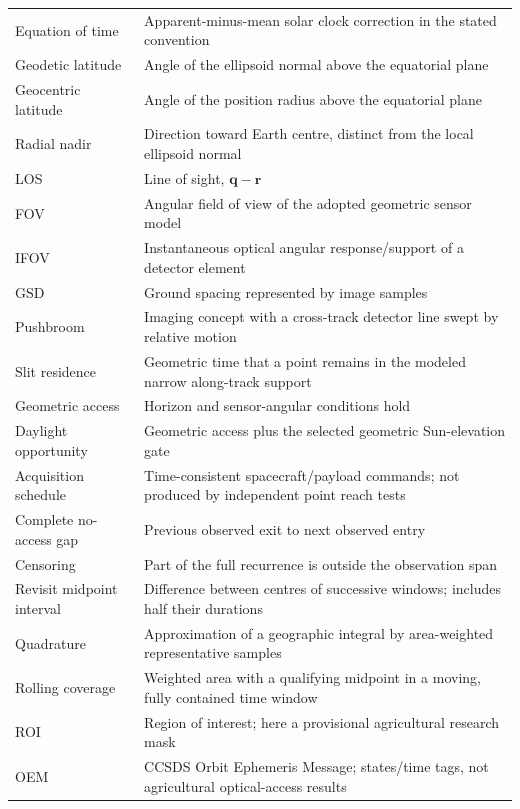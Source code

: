 \documentclass[10pt,a4paper]{article}
\numberwithin{equation}{section}
\begin{document}
\begin{longtable}{@{}>{\raggedright\arraybackslash}p{}>{\raggedright\arraybackslash}p{}@{}}
\rowcolor{rowalt}Equation of time & Apparent-minus-mean solar clock correction in the stated convention \\
Geodetic latitude & Angle of the ellipsoid normal above the equatorial plane \\
\rowcolor{rowalt}Geocentric latitude & Angle of the position radius above the equatorial plane \\
Radial nadir & Direction toward Earth centre, distinct from the local ellipsoid normal \\
\rowcolor{rowalt}LOS & Line of sight, \(\mathbf q-\mathbf r\) \\
FOV & Angular field of view of the adopted geometric sensor model \\
\rowcolor{rowalt}IFOV & Instantaneous optical angular response/support of a detector element \\
GSD & Ground spacing represented by image samples \\
\rowcolor{rowalt}Pushbroom & Imaging concept with a cross-track detector line swept by relative motion \\
Slit residence & Geometric time that a point remains in the modeled narrow along-track support \\
\rowcolor{rowalt}Geometric access & Horizon and sensor-angular conditions hold \\
Daylight opportunity & Geometric access plus the selected geometric Sun-elevation gate \\
\rowcolor{rowalt}Acquisition schedule & Time-consistent spacecraft/payload commands; not produced by independent point reach tests \\
Complete no-access gap & Previous observed exit to next observed entry \\
\rowcolor{rowalt}Censoring & Part of the full recurrence is outside the observation span \\
Revisit midpoint interval & Difference between centres of successive windows; includes half their durations \\
\rowcolor{rowalt}Quadrature & Approximation of a geographic integral by area-weighted representative samples \\
Rolling coverage & Weighted area with a qualifying midpoint in a moving, fully contained time window \\
\rowcolor{rowalt}ROI & Region of interest; here a provisional agricultural research mask \\
OEM & CCSDS Orbit Ephemeris Message; states/time tags, not agricultural optical-access results \\

\end{longtable}
\end{document}

